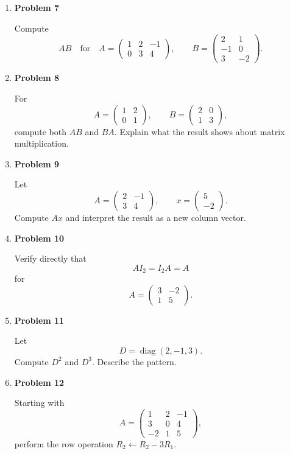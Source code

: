 \begin{enumerate}
\item \textbf{Problem 7}\par
Compute
\[
AB
\quad\text{for}\quad
A=\begin{pmatrix}1&2&-1\\0&3&4\end{pmatrix},
\qquad
B=\begin{pmatrix}2&1\\-1&0\\3&-2\end{pmatrix}.
\]

\item \textbf{Problem 8}\par
For
\[
A=\begin{pmatrix}1&2\\0&1\end{pmatrix},
\qquad
B=\begin{pmatrix}2&0\\1&3\end{pmatrix},
\]
compute both \(AB\) and \(BA\). Explain what the result shows about matrix multiplication.

\item \textbf{Problem 9}\par
Let
\[
A=\begin{pmatrix}2&-1\\3&4\end{pmatrix},
\qquad
x=\begin{pmatrix}5\\-2\end{pmatrix}.
\]
Compute \(Ax\) and interpret the result as a new column vector.

\item \textbf{Problem 10}\par
Verify directly that
\[
AI_2=I_2A=A
\]
for
\[
A=\begin{pmatrix}3&-2\\1&5\end{pmatrix}.
\]

\item \textbf{Problem 11}\par
Let
\[
D=\operatorname{diag}(2,-1,3).
\]
Compute \(D^2\) and \(D^3\). Describe the pattern.

\item \textbf{Problem 12}\par
Starting with
\[
A=\begin{pmatrix}
1&2&-1\\
3&0&4\\
-2&1&5
\end{pmatrix},
\]
perform the row operation \(R_2\leftarrow R_2-3R_1\).


\end{enumerate}
